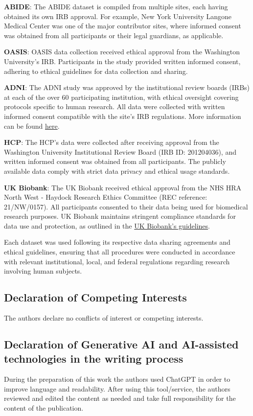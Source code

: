 \documentclass[final,5p,times,twocolumn,authoryear]{elsarticle}
\begin{document}
\noindent \textbf{ABIDE}: 
The ABIDE dataset is compiled from multiple sites, each having obtained its own IRB approval. For example, New York University Langone Medical Center was one of the major contributor sites, where informed consent was obtained from all participants or their legal guardians, as applicable.

\noindent \textbf{OASIS}:
OASIS data collection received ethical approval from the Washington University's IRB. Participants in the study provided written informed consent, adhering to ethical guidelines for data collection and sharing.

\noindent \textbf{ADNI}:
The ADNI study was approved by the institutional review boards (IRBs) at each of the over 60 participating institution, with ethical oversight covering protocols specific to human research. All data were collected with written informed consent compatible with the site's IRB regulations. More information can be found \href{http://adni.loni.usc.edu/about/governance/}{here}.

\noindent \textbf{HCP}: The HCP's data were collected after receiving approval from the Washington University Institutional Review Board (IRB ID: 201204036), and written informed consent was obtained from all participants. The publicly available data comply with strict data privacy and ethical usage standards.

\noindent \textbf{UK Biobank}: The UK Biobank received ethical approval from the NHS HRA North West - Haydock Research Ethics Committee (REC reference: 21/NW/0157). All participants consented to their data being used for biomedical research purposes.
UK Biobank maintains stringent compliance standards for data use and protection, as outlined in the \href{https://www.ukbiobank.ac.uk/learn-more-about-uk-biobank/about-us/ethics}{UK Biobank's guidelines}.

Each dataset was used following its respective data sharing agreements and ethical guidelines, ensuring that all procedures were conducted in accordance with relevant institutional, local, and federal regulations regarding research involving human subjects.

\subsection*{Declaration of Competing Interests}
The authors declare no conflicts of interest or competing interests.

\subsection*{Declaration of Generative AI and AI-assisted technologies in the writing process}
During the preparation of this work the authors used ChatGPT in order to improve language and readability. After using this tool/service, the authors reviewed and edited the content as needed and take full responsibility for the content of the publication.
\end{document}
